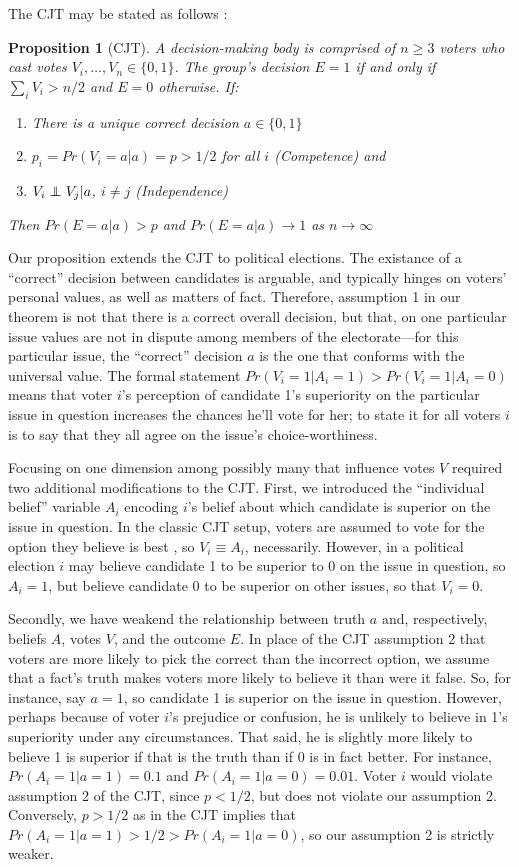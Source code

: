\documentclass[11pt]{article}
\def\independenT#1#2{\mathrel{\rlap{$#1#2$}\mkern2mu{#1#2}}}
\newcommand\independent{\protect\mathpalette{\protect\independenT}{\perp}}
\newtheorem*{prop*}{Proposition}
\begin{document}
The CJT may be stated as follows \citep[e.g.][]{boland1989majority}:
\begin{prop*}[CJT]
A decision-making body is comprised of $n\ge 3$ voters who cast votes
$V_i,\dots,V_n\in \{0,1\}$. The group's decision $E= 1$ if and only if
$\sum_i V_i>n/2$ and $E=0$ otherwise.
If:
\begin{enumerate}
\item There is a unique correct decision $a\in \{0,1\}$
\item $p_i=Pr(V_i=a|a)=p>1/2$ for all $i$ (Competence) and
\item $V_i \independent V_j|a$, $i\ne j$ (Independence)
\end{enumerate}
Then $Pr(E=a|a)>p$ and $Pr(E=a|a)\rightarrow 1$ as
$n\rightarrow\infty$
\end{prop*}

Our proposition extends the CJT to political elections.
The existance of a ``correct'' decision
between candidates is arguable, and typically hinges on voters'
personal values, as well as matters of fact. 
Therefore, assumption 1 in our theorem is not that there is a correct
overall decision, but that, on one particular issue values are not in
dispute among members of the electorate---for this particular issue,
the ``correct'' decision $a$ is the one that conforms with the
universal value. 
The formal statement $Pr(V_i=1|A_i=1) > Pr(V_i=1|A_i=0)$ means
that voter $i$'s perception of candidate 1's superiority on the
particular issue in question increases the chances he'll vote for
her; to state it for all voters $i$ is to say that they all agree on
the issue's choice-worthiness. 

Focusing on one dimension among possibly many that influence votes $V$
required two additional modifications to the CJT.
First, we introduced the ``individual belief'' variable $A_i$ encoding
$i$'s belief about which candidate is superior on the issue in
question.
In the classic CJT setup, voters are assumed to vote for the option
they believe is best \citep[See][however]{austen1996information}, so
$V_i\equiv A_i$, necessarily. 
However, in a political election $i$ may believe candidate 1 to be
superior to 0 on the issue in question, so $A_i=1$, but believe
candidate 0 to be superior on other issues, so that $V_i=0$.

Secondly, we have weakend the relationship between truth $a$ and,
respectively, beliefs $A$, votes $V$, and the outcome $E$.
In place of the CJT assumption 2 that voters are more likely to pick
the correct than the incorrect option, we assume that a fact's truth
makes voters more likely to believe it than were it false.
So, for instance, say $a=1$, so candidate 1 is superior on the issue
in question. 
However, perhaps because of voter $i$'s prejudice or confusion, he is
unlikely to believe in 1's superiority under any circumstances.
That said, he is slightly more likely to believe 1 is superior if that
is the truth than if 0 is in fact better.
For instance, $Pr(A_i=1|a=1)=0.1$ and $Pr(A_i=1|a=0)=0.01$. 
Voter $i$ would violate assumption 2 of the CJT, since $p<1/2$, but
does not violate our assumption 2.
Conversely, $p>1/2$ as in the CJT implies that
$Pr(A_i=1|a=1)>1/2>Pr(A_i=1|a=0)$, so our assumption 2 is strictly
weaker.
\end{document}
